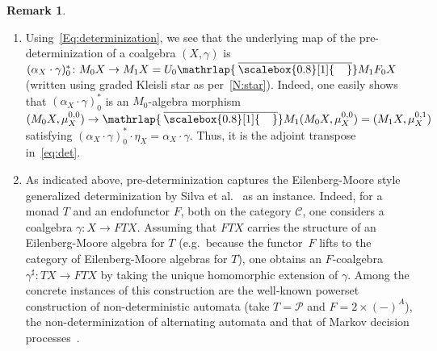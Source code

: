 \documentclass[sigconf,
			final%
			nonacm
                        ]{acmart}
\numberwithin{equation}{section}
\numberwithin{equation}{section}
\theoremstyle{plain}
\theoremstyle{definition}
\newtheorem{rem}[thm]{Remark}
\newcommand{\mybar}[3]{%
  \mathrlap{\hspace{#2}\overline{\scalebox{#1}[1]{\hphantom{\ensuremath{#3}}\vphantom{\rule{0pt}{5.5pt}}}}}\ensuremath{#3}
}
\newcommand{\barM}{\mybar{0.8}{2pt}{M}_1}
\newcommand{\M}{\mathbb{M}}                   %
\newcommand{\CatC}{\mathscr{C}}           %
\newcommand{\Set}{\mathbf{Set}}
\DeclareMathOperator{\Alg}{\mathsf{Alg}}
\newcommand{\pow}{\mathscr P}              %
\begin{document}
\begin{rem}
\begin{enumerate}
    On the other hand, the condition $M_01=1$ fails for trace
    equivalence of unrestricted systems where we have~\mbox{$M_0=\pow$,}
    which in fact
    constitutes a radical example where behavioural equivalence on the
    pre-determization is strictly coarser than the given graded
    equivalence. In this case, since the actions preserve the
    bottom~$0$, we in fact have~$\barM 1=1$: it follows that \emph{all}
    states in $\barM$-coalgebras are behaviourally equivalent (as
    the unique coalgebra structure on~$1$ is final).




  \item Using~\eqref{Eq:determinization}, we see that the underlying
    map of the pre-determinization of a coalgebra $(X,\gamma)$ is
    $(\alpha_X \cdot \gamma)^*_0 \colon M_0X \to M_1 X = U_0\barM F_0
    X$ (written using graded Kleisli star as
    per~\cref{N:star}). Indeed, one easily shows that
    $(\alpha_X \cdot\gamma)^*_0$ is an $M_0$-algebra
    morphism %
    $(M_0 X, \mu^{0,0}_X)\to\barM
    (M_0X,\mu^{0,0}_X)=(M_1X,\mu^{0,1}_X)$ satisfying
    $(\alpha_X \cdot \gamma)^*_0 \cdot \eta_X = \alpha_X \cdot
    \gamma$. Thus, it is the adjoint transpose in~\eqref{eq:det}.

  \item As indicated above, pre-de\-ter\-mi\-ni\-za\-tion captures the
    Eilenberg-Moore style generalized determinization by Silva et
    al.~\cite{BBSR13} as an instance. Indeed, for a monad $T$ and an
    endofunctor $F$, both on the category $\CatC$, one considers a
    coalgebra $\gamma\colon X \to FTX$. Assuming that $FTX$ carries
    the structure of an Eilenberg-Moore algebra for $T$ (e.g.~because
    the functor~$F$ lifts to the category of Eilenberg-Moore algebras
    for $T$), one obtains an
    $F$-coalgebra $\gamma^\sharp\colon TX \to FTX$ by taking the
    unique homomorphic extension of $\gamma$. Among the concrete
    instances of this construction are the well-known powerset
    construction of non-deterministic automata (take $T = \pow$ and
    $F = 2 \times (-)^A$), the non-determinization of alternating
    automata and that of Markov decision processes~\cite{JSS15}.


\end{enumerate}
\end{rem}
\end{document}
